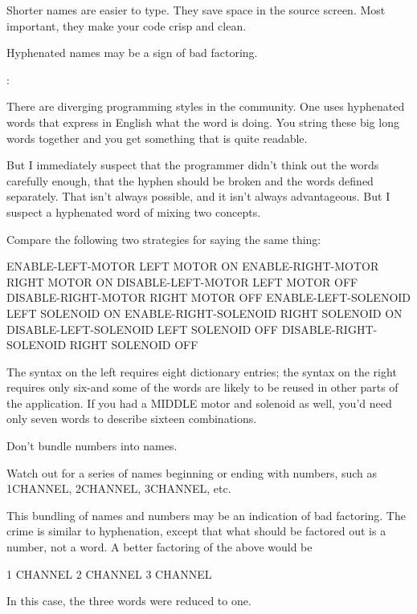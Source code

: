 Shorter names are easier to type.  They save space in the source
screen.  Most important, they make your code crisp and clean.

\begin{tip}
Hyphenated names may be a sign of bad factoring.
\end{tip}%

\begin{interview}
:

\begin{tfquot}
There are diverging programming styles in the \Forth{} community.  One
uses hyphenated words that express in English what the word is doing.
You string these big long words together and you get something that is
quite readable.

But I immediately suspect that the programmer didn't think out the words
carefully enough, that the hyphen should be broken and the words defined
separately.  That isn't always possible, and it isn't always advantageous.
But I suspect a hyphenated word of mixing two concepts.
\end{tfquot}
\end{interview}
Compare the following two strategies for saying the same thing:
\begin{Code}
ENABLE-LEFT-MOTOR        LEFT MOTOR ON
ENABLE-RIGHT-MOTOR       RIGHT MOTOR ON
DISABLE-LEFT-MOTOR       LEFT MOTOR OFF
DISABLE-RIGHT-MOTOR      RIGHT MOTOR OFF
ENABLE-LEFT-SOLENOID     LEFT SOLENOID ON
ENABLE-RIGHT-SOLENOID    RIGHT SOLENOID ON
DISABLE-LEFT-SOLENOID    LEFT SOLENOID OFF
DISABLE-RIGHT-SOLENOID   RIGHT SOLENOID OFF
\end{Code}
The syntax on the left requires eight dictionary entries; the syntax on the
right requires only six-and some of the words are likely to be reused in
other parts of the application.  If you had a MIDDLE motor and solenoid
as well, you'd need only seven words to describe sixteen combinations.

\begin{tip}
Don't bundle numbers into names.
\end{tip}
Watch out for a series of names beginning or ending with numbers, such
as 1CHANNEL, 2CHANNEL, 3CHANNEL, etc.

This bundling of names and numbers may be an indication of bad
factoring.  The crime is similar to hyphenation, except that what should
be factored out is a number, not a word.  A better factoring of the above
would be
\begin{Code}
1 CHANNEL
2 CHANNEL
3 CHANNEL
\end{Code}
In this case, the three words were reduced to one.

